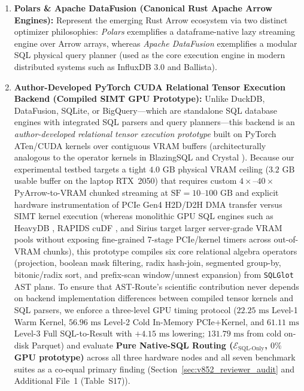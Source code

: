 \documentclass[10pt,a4paper]{article}
\begin{document}
\begin{enumerate}[leftmargin=1.5em,itemsep=0.8pt]
    \item \textbf{Polars \& Apache DataFusion (Canonical Rust Apache Arrow Engines):} Represent the emerging Rust Arrow ecosystem via two distinct optimizer philosophies: \emph{Polars} exemplifies a dataframe-native lazy streaming engine over Arrow arrays, whereas \emph{Apache DataFusion} \cite{lamb2024datafusion} exemplifies a modular SQL physical query planner (used as the core execution engine in modern distributed systems such as InfluxDB 3.0 and Ballista).
    \item \textbf{Author-Developed PyTorch CUDA Relational Tensor Execution Backend (Compiled SIMT GPU Prototype):} Unlike DuckDB, DataFusion, SQLite, or BigQuery---which are standalone SQL database engines with integrated SQL parsers and query planners---this backend is an \emph{author-developed relational tensor execution prototype} built on PyTorch ATen/CUDA kernels over contiguous VRAM buffers (architecturally analogous to the operator kernels in BlazingSQL \cite{kim2022blazingsql} and Crystal \cite{shanbhag2020crystal}). Because our experimental testbed targets a tight $4.0\text{ GB}$ physical VRAM ceiling ($3.2\text{ GB}$ usable buffer on the laptop RTX~2050) that requires custom $4\times\text{--}40\times$ PyArrow-to-VRAM chunked streaming at $\text{SF}=10\text{--}100\text{ GB}$ and explicit hardware instrumentation of PCIe Gen4 H2D/D2H DMA transfer versus SIMT kernel execution (whereas monolithic GPU SQL engines such as HeavyDB \cite{root2019mapd}, RAPIDS cuDF \cite{kim2022blazingsql}, and Sirius \cite{yogatama2025sirius} target larger server-grade VRAM pools without exposing fine-grained 7-stage PCIe/kernel timers across out-of-VRAM chunks), this prototype compiles six core relational algebra operators (projection, boolean mask filtering, radix hash-join, segmented group-by, bitonic/radix sort, and prefix-scan window/unnest expansion) from \texttt{SQLGlot} AST plans. To ensure that AST-Route's scientific contribution never depends on backend implementation differences between compiled tensor kernels and SQL parsers, we enforce a three-level GPU timing protocol ($22.25\text{ ms}$ Level-1 Warm Kernel, $56.96\text{ ms}$ Level-2 Cold In-Memory PCIe+Kernel, and $61.11\text{ ms}$ Level-3 Full SQL-to-Result with $+4.15\text{ ms}$ lowering; $131.79\text{ ms}$ from cold on-disk Parquet) and evaluate \textbf{Pure Native-SQL Routing ($\mathcal{E}_{\text{SQL-Only}}$, $0\%$ GPU prototype)} across all three hardware nodes and all seven benchmark suites as a co-equal primary finding (Section~\ref{sec:v852_reviewer_audit} and Additional File~1 (Table~S17)).
\end{enumerate}
\end{document}
